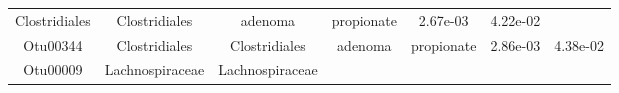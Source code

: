 \documentclass[11pt,]{article}
\begin{document}
\begin{longtable}[]{@{}ccccccc@{}}
\begin{minipage}[t]{0.17\columnwidth}
Clostridiales\strut
\end{minipage} & \begin{minipage}[t]{0.17\columnwidth}\centering\strut
Clostridiales\strut
\end{minipage} & \begin{minipage}[t]{0.09\columnwidth}\centering\strut
adenoma\strut
\end{minipage} & \begin{minipage}[t]{0.11\columnwidth}\centering\strut
propionate\strut
\end{minipage} & \begin{minipage}[t]{0.09\columnwidth}\centering\strut
2.67e-03\strut
\end{minipage} & \begin{minipage}[t]{0.09\columnwidth}\centering\strut
4.22e-02\strut
\end{minipage}\tabularnewline
\begin{minipage}[t]{0.09\columnwidth}\centering\strut
Otu00344\strut
\end{minipage} & \begin{minipage}[t]{0.17\columnwidth}\centering\strut
Clostridiales\strut
\end{minipage} & \begin{minipage}[t]{0.17\columnwidth}\centering\strut
Clostridiales\strut
\end{minipage} & \begin{minipage}[t]{0.09\columnwidth}\centering\strut
adenoma\strut
\end{minipage} & \begin{minipage}[t]{0.11\columnwidth}\centering\strut
propionate\strut
\end{minipage} & \begin{minipage}[t]{0.09\columnwidth}\centering\strut
2.86e-03\strut
\end{minipage} & \begin{minipage}[t]{0.09\columnwidth}\centering\strut
4.38e-02\strut
\end{minipage}\tabularnewline
\begin{minipage}[t]{0.09\columnwidth}\centering\strut
Otu00009\strut
\end{minipage} & \begin{minipage}[t]{0.17\columnwidth}\centering\strut
Lachnospiraceae\strut
\end{minipage} & \begin{minipage}[t]{0.17\columnwidth}\centering\strut
Lachnospiraceae\strut
\end{minipage} & \begin{minipage}[t]{0.09\columnwidth}\centering\strut

\end{minipage}
\end{longtable}
\end{document}
